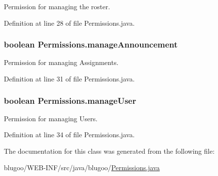 Permission for managing the roster. 



Definition at line 28 of file Permissions.java.\hypertarget{classPermissions_2bc565084a5e7f7f21fd126ef11be7bc}{
\subsubsection{\setlength{\rightskip}{0pt plus 5cm}boolean {\bf Permissions.manageAnnouncement}}}
\label{classPermissions_2bc565084a5e7f7f21fd126ef11be7bc}


Permission for managing Assignments. 



Definition at line 31 of file Permissions.java.\hypertarget{classPermissions_23f340ecd5cffadea618bfdeebc15554}{
\subsubsection{\setlength{\rightskip}{0pt plus 5cm}boolean {\bf Permissions.manageUser}}}
\label{classPermissions_23f340ecd5cffadea618bfdeebc15554}


Permission for managing Users. 



Definition at line 34 of file Permissions.java.

The documentation for this class was generated from the following file:\begin{CompactItemize}
\item 
blugoo/WEB-INF/src/java/blugoo/\hyperlink{Permissions_8java}{Permissions.java}\end{CompactItemize}
